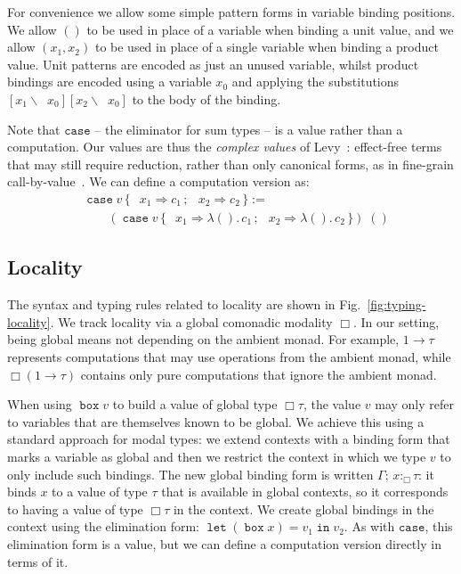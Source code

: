 \documentclass[acmsmall, screen, review, anonymous]{acmart}
\theoremstyle{definition}
\newcommand{\glob}{\mathop{\Box}}
\newcommand{\arr}{\rightarrow}
\newcommand{\seq}{\,;\,}
\newcommand{\fstname}{\mathop{\pi_1}}
\newcommand{\fst}[1]{\fstname #1}
\newcommand{\sndname}{\mathop{\pi_2}}
\newcommand{\snd}[1]{\sndname #1}
\newcommand{\inlname}{\mathop{\mathtt{in}_L}}
\newcommand{\inl}[1]{\inlname #1}
\newcommand{\inrname}{\mathop{\mathtt{in}_R}}
\newcommand{\inr}[1]{\inrname #1}
\newcommand{\casename}{\mathtt{case}}
\newcommand{\case}[5]{\mathop{\casename} #1 \,\{\,\inl{#2} \Rightarrow #3 \seq \inr{#4} \Rightarrow #5 \,\}}
\newcommand{\gtypes}{\mathrel{:_{\Box}}}
\newcommand{\abs}[2]{\lambda#1.\,#2}
\newcommand{\ccons}[2]{#1;\,#2}
\newcommand{\gbind}[3]{\ccons{#1}{#2\gtypes#3}}
\newcommand{\gboxname}{\mathop{\mathtt{box}}}
\newcommand{\gbox}[1]{\gboxname #1}
\newcommand{\gunbox}[3]{\mathop{\mathtt{let}} (\gbox{#1}) = #2 \mathop{\mathtt{in}} #3}
\newcommand{\sub}[2]{[#1\backslash#2]}
\begin{document}
For convenience we allow some simple pattern forms in variable binding
positions. We allow $()$ to be used in place of a variable when binding
a unit value, and we allow $(x_1, x_2)$ to be used in place of a single
variable when binding a product value. Unit patterns are encoded as just
an unused variable, whilst product bindings are encoded using a variable
$x_0$ and applying the substitutions
$\sub{x_1}{\fst{x_0}}\sub{x_2}{\snd{x_0}}$ to the body of the binding.

Note that $\casename$ -- the eliminator for sum types -- is a value
rather than a computation. Our values are thus the \emph{complex
  values} of Levy~\cite{levy2004cbpv}: effect-free terms that may
still require reduction, rather than only canonical forms, as in
fine-grain call-by-value~\cite{levy2003modelling}. We can define a
computation version as:
\begin{align*}
    &\case{v}{x_1}{c_1}{x_2}{c_2} := \\
    &\qquad (\case{v}{x_1}{\abs{()}{c_1}}{x_2}{\abs{()}{c_2}}) \; ()
\end{align*}

\subsection{Locality}

The syntax and typing rules related to locality are shown in
Fig.~\ref{fig:typing-locality}. We track locality via a global
comonadic modality $\glob$. In our setting, being global means not depending on the ambient monad. For
example, $1 \arr \tau$ represents computations that may use operations from
the ambient monad, while $\glob (1 \arr \tau)$ contains only pure
computations that ignore the ambient monad.

When using $\gbox{v}$ to build a value of global type $\glob \tau$,
the value $v$ may only refer to variables that are themselves known to
be global. We achieve this using a standard approach for modal types:
we extend contexts with a binding form that marks a variable as global
and then we restrict the context in which we type $v$ to only include
such bindings. The new global binding form is written
$\gbind{\Gamma}{x}{\tau}$: it binds $x$ to a value of type $\tau$ that
is available in global contexts, so it corresponds to having a value of
type $\glob \tau$ in the context. We create global bindings in the
context using the elimination form: $\gunbox{x}{v_1}{v_2}$. As with $\casename$,
this elimination form is a value, but we can define a computation
version directly in terms of it.
\end{document}
